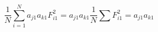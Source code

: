 \begin{equation}
	\frac{1}{N}\sum_{i=1}^{N}a_{j1}a_{k1}F_{i1}^2=a_{j1}a_{k1}\frac{1}{N}\sum F_{i1}^2=a_{j1}a_{k1}
\end{equation}

